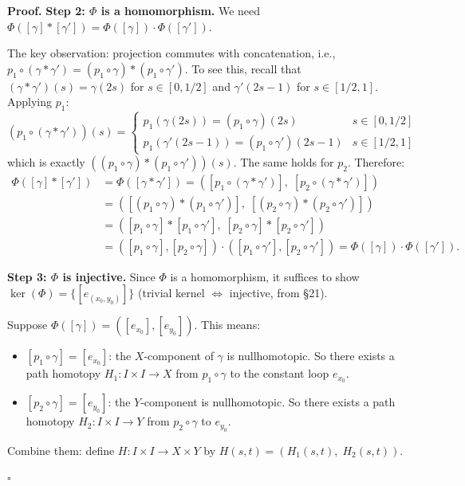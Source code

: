 \documentclass[11pt]{report}
\renewenvironment{proof}[1][Proof]{\noindent\textbf{#1.} }{\hfill$\square$\par\vspace{5pt}}
\begin{document}
\begin{proof}
\textbf{Step 2: $\Phi$ is a homomorphism.} We need $\Phi([\gamma] * [\gamma']) = \Phi([\gamma]) \cdot \Phi([\gamma'])$.

The key observation: projection commutes with concatenation, i.e., $p_1 \circ (\gamma * \gamma') = (p_1 \circ \gamma) * (p_1 \circ \gamma')$. To see this, recall that $(\gamma * \gamma')(s) = \gamma(2s)$ for $s \in [0, 1/2]$ and $\gamma'(2s-1)$ for $s \in [1/2, 1]$. Applying $p_1$:
\[(p_1 \circ (\gamma * \gamma'))(s) = \begin{cases} p_1(\gamma(2s)) = (p_1 \circ \gamma)(2s) & s \in [0, 1/2] \\ p_1(\gamma'(2s-1)) = (p_1 \circ \gamma')(2s-1) & s \in [1/2, 1] \end{cases}\]
which is exactly $((p_1 \circ \gamma) * (p_1 \circ \gamma'))(s)$. The same holds for $p_2$. Therefore:
\begin{align*}
\Phi([\gamma] * [\gamma']) &= \Phi([\gamma * \gamma']) = ([p_1 \circ (\gamma * \gamma')], \; [p_2 \circ (\gamma * \gamma')]) \\
&= ([(p_1 \circ \gamma) * (p_1 \circ \gamma')], \; [(p_2 \circ \gamma) * (p_2 \circ \gamma')]) \\
&= ([p_1 \circ \gamma] * [p_1 \circ \gamma'], \; [p_2 \circ \gamma] * [p_2 \circ \gamma']) \\
&= ([p_1 \circ \gamma], [p_2 \circ \gamma]) \cdot ([p_1 \circ \gamma'], [p_2 \circ \gamma']) = \Phi([\gamma]) \cdot \Phi([\gamma']).
\end{align*}

\textbf{Step 3: $\Phi$ is injective.} Since $\Phi$ is a homomorphism, it suffices to show $\ker(\Phi) = \{[e_{(x_0,y_0)}]\}$ (trivial kernel $\Leftrightarrow$ injective, from \S 21).

Suppose $\Phi([\gamma]) = ([e_{x_0}], [e_{y_0}])$. This means:
\begin{itemize}[nosep]
    \item $[p_1 \circ \gamma] = [e_{x_0}]$: the $X$-component of $\gamma$ is nullhomotopic. So there exists a path homotopy $H_1: I \times I \to X$ from $p_1 \circ \gamma$ to the constant loop $e_{x_0}$.
    \item $[p_2 \circ \gamma] = [e_{y_0}]$: the $Y$-component is nullhomotopic. So there exists a path homotopy $H_2: I \times I \to Y$ from $p_2 \circ \gamma$ to $e_{y_0}$.
\end{itemize}
Combine them: define $H: I \times I \to X \times Y$ by $H(s, t) = (H_1(s, t), \; H_2(s, t))$.


\end{proof}
\end{document}
